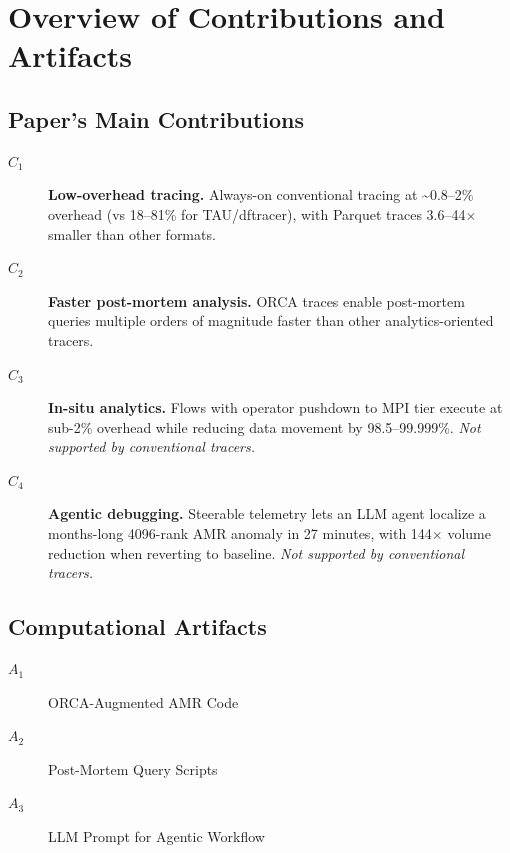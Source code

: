\documentclass[nonacm,sigconf]{acmart}
\begin{document}


\appendixAD

\section{Overview of Contributions and Artifacts}

\subsection{Paper's Main Contributions}

\begin{description}
	\item[$C_1$] \textbf{Low-overhead tracing.} Always-on conventional tracing at \textasciitilde0.8--2\% overhead (vs 18--81\% for TAU/dftracer), with Parquet traces 3.6--44$\times$ smaller than other formats.
	\item[$C_2$] \textbf{Faster post-mortem analysis.} ORCA traces enable post-mortem queries multiple orders of magnitude faster than other analytics-oriented tracers.
	\item[$C_3$] \textbf{In-situ analytics.} 
	Flows with operator pushdown to MPI tier execute at sub-2\% overhead while reducing data movement by 98.5--99.999\%. 
	\emph{Not supported by conventional tracers.}
	\item[$C_4$] \textbf{Agentic debugging.} Steerable telemetry lets an LLM agent localize a months-long 4096-rank AMR anomaly in 27 minutes, with 144$\times$ volume reduction when reverting to baseline. \emph{Not supported by conventional tracers.}
\end{description}

\subsection{Computational Artifacts}

\begin{description}
	\item[$A_1$] ORCA-Augmented AMR Code
	\item[$A_2$] Post-Mortem Query Scripts
	\item[$A_3$] LLM Prompt for Agentic Workflow
\end{description}
\end{document}
